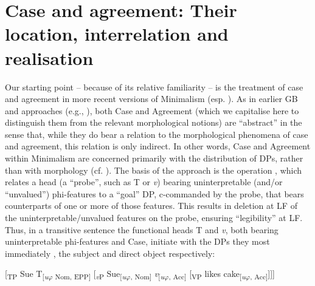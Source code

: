 \documentclass[output=paper]{langsci/langscibook}
\begin{document}
\section{Case and agreement: Their location, interrelation and realisation}
Our starting point – because of its relative familiarity – is the treatment of case and agreement in more recent versions of Minimalism (esp. \citealt{Chomsky2000,Chomsky2000,Pesetsky2001,Pesetsky2007}). As in earlier GB and  approaches (e.g., \citealt{Chomsky1980,Chomsky1981,Chomsky1995}), both Case and Agreement (which we capitalise here to distinguish them from the relevant morphological notions) are ``abstract'' in the sense that, while they do bear a relation to the morphological phenomena of case and agreement, this relation is only indirect. In other words, Case and Agreement within Minimalism are concerned primarily with the distribution of DPs, rather than with morphology (cf. \citealt{Bobaljik2008Case}). The basis of the approach is the operation , which relates a head (a ``probe'', such as T or \textit{v}) bearing uninterpretable (and\slash or ``unvalued'') phi-features to a ``goal'' DP, c-commanded by the probe, that bears counterparts of one or more of those features. This results in deletion at LF of the uninterpretable\slash unvalued features on the probe, ensuring ``legibility'' at LF. Thus, in a transitive sentence the functional heads T and \textit{v}, both bearing uninterpretable phi-features and Case, initiate  with the DPs they most immediately , the subject and direct object respectively:

\ea%
    \label{ex:intro:1}
[\textsubscript{TP} Sue T\textsubscript{[}\textit{\textsubscript{u}}\textsubscript{$\varphi $ Nom, EPP]} [\textit{\textsubscript{v}}\textsubscript{P} Sue\textsubscript{[}\textit{\textsubscript{u}}\textsubscript{$\varphi $, Nom]} \textit{v}\textsubscript{[}\textit{\textsubscript{u}}\textsubscript{$\varphi $, Acc]} [\textsubscript{VP} likes cake\textsubscript{[}\textit{\textsubscript{u}}\textsubscript{$\varphi $, Acc]}]]]
    \z
 

 
\end{document}
